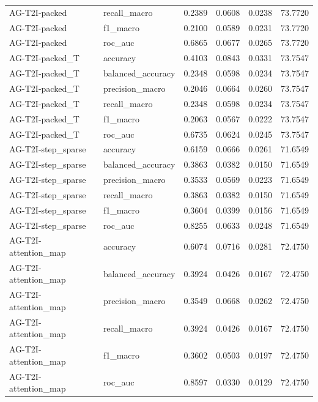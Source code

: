 \begin{tabular}{llrrrr}
AG-T2I-packed & recall_macro & 0.2389 & 0.0608 & 0.0238 & 73.7720 \\
AG-T2I-packed & f1_macro & 0.2100 & 0.0589 & 0.0231 & 73.7720 \\
AG-T2I-packed & roc_auc & 0.6865 & 0.0677 & 0.0265 & 73.7720 \\
AG-T2I-packed_T & accuracy & 0.4103 & 0.0843 & 0.0331 & 73.7547 \\
AG-T2I-packed_T & balanced_accuracy & 0.2348 & 0.0598 & 0.0234 & 73.7547 \\
AG-T2I-packed_T & precision_macro & 0.2046 & 0.0664 & 0.0260 & 73.7547 \\
AG-T2I-packed_T & recall_macro & 0.2348 & 0.0598 & 0.0234 & 73.7547 \\
AG-T2I-packed_T & f1_macro & 0.2063 & 0.0567 & 0.0222 & 73.7547 \\
AG-T2I-packed_T & roc_auc & 0.6735 & 0.0624 & 0.0245 & 73.7547 \\
AG-T2I-step_sparse & accuracy & 0.6159 & 0.0666 & 0.0261 & 71.6549 \\
AG-T2I-step_sparse & balanced_accuracy & 0.3863 & 0.0382 & 0.0150 & 71.6549 \\
AG-T2I-step_sparse & precision_macro & 0.3533 & 0.0569 & 0.0223 & 71.6549 \\
AG-T2I-step_sparse & recall_macro & 0.3863 & 0.0382 & 0.0150 & 71.6549 \\
AG-T2I-step_sparse & f1_macro & 0.3604 & 0.0399 & 0.0156 & 71.6549 \\
AG-T2I-step_sparse & roc_auc & 0.8255 & 0.0633 & 0.0248 & 71.6549 \\
AG-T2I-attention_map & accuracy & 0.6074 & 0.0716 & 0.0281 & 72.4750 \\
AG-T2I-attention_map & balanced_accuracy & 0.3924 & 0.0426 & 0.0167 & 72.4750 \\
AG-T2I-attention_map & precision_macro & 0.3549 & 0.0668 & 0.0262 & 72.4750 \\
AG-T2I-attention_map & recall_macro & 0.3924 & 0.0426 & 0.0167 & 72.4750 \\
AG-T2I-attention_map & f1_macro & 0.3602 & 0.0503 & 0.0197 & 72.4750 \\
AG-T2I-attention_map & roc_auc & 0.8597 & 0.0330 & 0.0129 & 72.4750 \\
\bottomrule
\end{tabular}

